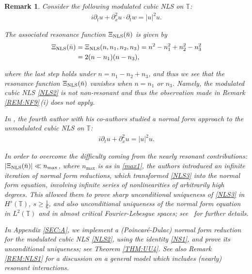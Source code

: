 \documentclass[letterpaper, 11pt,  reqno]{amsart}
\newtheorem{remark}[theorem]{Remark}
\newcommand{\1}{\hspace{0.5mm}\text{I}\hspace{0.5mm}}
\newcommand{\noi}{\noindent}
\newcommand{\T}{\mathbb{T}}
\newcommand{\dx}{\partial_x}
\newcommand{\dt}{\partial_t}
\newcommand{\NLS}{\text{\rm NLS} }
\numberwithin{equation}{section}
\numberwithin{theorem}{section}
\begin{document}
\begin{remark}\label{REM:NLS}\rm
Consider the following modulated cubic NLS on $\T$:
\begin{align}
i \dt u + \dx^2 u \cdot \dt w= |u|^2u.
\label{NLS2}
\end{align}

\noi
The associated resonance function 
$\Xi_\NLS (\bar n)$  is given by 
\begin{align}
\begin{split}
\Xi_\NLS (\bar n)
& = \Xi_\NLS(n,n_1,n_2, n_3) = 
n^2 - n_1^2 + n_2^2 - n_3^2\\
& = 2(n- n_1) (n - n_3), 
\end{split}
\label{Xi9}
\end{align}


\noi
where the last step holds under $n = n_1 - n_2 + n_3$, 
and thus we see that 
 the resonance function 
$\Xi_\NLS (\bar n)$
 vanishes when $n = n_1$ or $n_3$.
Namely, the modulated cubic NLS \eqref{NLS2} is 
{\it not} non-resonant and thus the observation made in 
Remark \ref{REM:NF9}\,(i) 
does not apply.




In \cite{GKO, OW}, 
the fourth author with his co-authors 
studied a normal form approach to 
 the unmodulated cubic NLS  on $\T$:
\begin{align}
i \dt u + \dx^2 u = |u|^2u.
\label{NLS3}
\end{align}

\noi
In order to overcome
the difficulty coming from  the nearly resonant contributions: $|\Xi_\NLS(\bar n)| \ll n_{\max}$, 
where $n_{\max}$ is as in \eqref{max1},
the authors introduced 
 an 
 infinite iteration of normal form reductions, 
which  transformed \eqref{NLS3}
 into the normal form equation, 
involving infinite series of nonlinearities of arbitrarily high degrees.
This allowed them to prove 
sharp unconditional uniqueness 
of  \eqref{NLS3} in $H^s(\T)$, $s \ge \frac 16$, 
and also unconditional uniqueness
of the normal form equation in $L^2(\T)$
and 
in almost critical Fourier-Lebesgue spaces;
see~\cite{OW}
for further details.



In Appendix \ref{SEC:A}, 
we implement a (Poincar\'e-Dulac) normal form reduction for the modulated cubic NLS \eqref{NLS2}, 
using the identity 
\eqref{NS1},
and prove its unconditional uniqueness;
 see Theorem \ref{THM:UU4}. %
See also Remark \ref{REM:NLS1}
for a discussion on 
a general model which includes (nearly) resonant interactions.

\end{remark}
\end{document}
